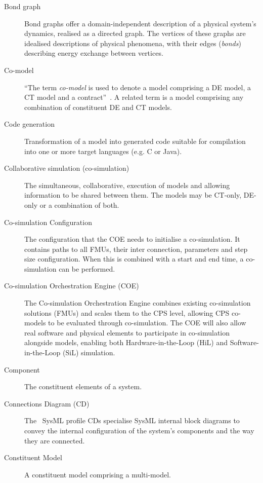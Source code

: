 \begin{description}
\item[Bond graph]  Bond graphs offer a domain-independent description of a physical system's dynamics, realised as a directed graph. The vertices of these graphs are idealised descriptions of physical phenomena, with their edges (\emph{bonds}) describing energy exchange between vertices.

\item[Co-model] ``The term \emph{co-model} is used to denote a model comprising a DE model, a CT model and a contract''~\cite{Broenink&12b}. A related term  is a model comprising any combination of constituent DE and CT models.

\item[Code generation] Transformation of a model into generated code suitable for compilation into one or more target languages (e.g. C or Java).

\item[Collaborative simulation (co-simulation)] The simultaneous, collaborative, execution of models and allowing information to be shared between them. The models may be CT-only, DE-only or a combination of both.

\item[Co-simulation Configuration] The configuration that the COE needs to initialise a co-simulation. It contains paths to all FMUs, their inter connection, parameters and step size configuration. When this is combined with a start and end time, a co-simulation can be performed.

\item[Co-simulation Orchestration Engine (COE)] The Co-simulation Orchestration Engine  combines existing co-simulation solutions (FMUs) and scales them to the CPS level, allowing CPS co-models to be evaluated through co-simulation. The COE will also allow real software and physical elements to participate in co-simulation alongside models, enabling both Hardware-in-the-Loop (HiL) and Software-in-the-Loop (SiL) simulation.

\item[Component] The constituent elements of a system.

\item[Connections Diagram (CD)] The \into\ SysML profile CDs specialise SysML internal block diagrams to convey the internal configuration of the system's components and the way they are connected.

\item[Constituent Model] A constituent model comprising a multi-model.


\end{description}
